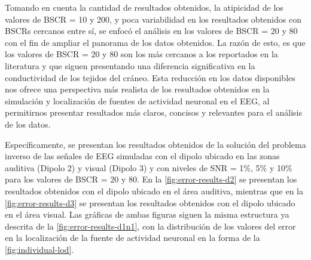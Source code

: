 Tomando en cuenta la cantidad de resultados obtenidos, la atipicidad de los valores de BSCR = 10 y 200, y poca variabilidad en los resultados obtenidos con BSCRs cercanos entre sí, se enfocó el análisis en los valores de BSCR = 20 y 80 con el fin de ampliar el panorama de los datos obtenidos.
La razón de esto, es que los valores de BSCR = 20 y 80 son los más cercanos a los reportados en la literatura y que siguen presentando una diferencia significativa en la conductividad de los tejidos del cráneo.
Esta reducción en los datos disponibles nos ofrece una perspectiva más realista de los resultados obtenidos en la simulación y localización de fuentes de actividad neuronal en el EEG, al permitirnos presentar resultados más claros, concisos y relevantes para el análisis de los datos.

Específicamente, se presentan los resultados obtenidos de la solución del problema inverso de las señales de EEG simuladas con el dipolo ubicado en las zonas auditiva (Dipolo 2) y visual (Dipolo 3) y con niveles de SNR = 1\%, 5\% y 10\% para los valores de BSCR = 20 y 80.
En la \cref{fig:error-results-d2} se presentan los resultados obtenidos con el dipolo ubicado en el área auditiva, mientras que en la \cref{fig:error-results-d3} se presentan los resultados obtenidos con el dipolo ubicado en el área visual.
Las gráficas de ambas figuras siguen la misma estructura ya descrita de la \cref{fig:error-results-d1n1}, con la distribución de los valores del error en la localización de la fuente de actividad neuronal en la forma de la \cref{fig:individual-lod}.

